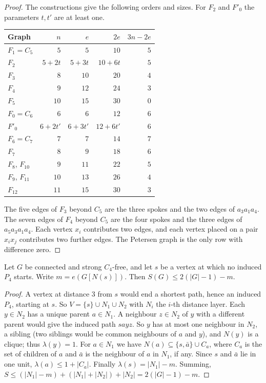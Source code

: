 \documentclass[ASNA]{USG}
\theoremstyle{WBstyletwo}
\numberwithin{equation}{section}
\begin{document}
\begin{proof}
The constructions give the following orders and sizes. For $F_2$ and $F'_0$ the parameters $t,t'$ are at least one.
\begin{center}
\begin{tabular}{@{}lrrrr@{}}
\toprule
Graph & $n$ & $e$ & $2e$ & $3n-2e$\\
\midrule
$F_1=C_5$ & $5$ & $5$ & $10$ & $5$\\
$F_2$ & $5+2t$ & $5+3t$ & $10+6t$ & $5$\\
$F_3$ & $8$ & $10$ & $20$ & $4$\\
$F_4$ & $9$ & $12$ & $24$ & $3$\\
$F_5$ & $10$ & $15$ & $30$ & $0$\\
$F_0=C_6$ & $6$ & $6$ & $12$ & $6$\\
$F'_0$ & $6+2t'$ & $6+3t'$ & $12+6t'$ & $6$\\
$F_6=C_7$ & $7$ & $7$ & $14$ & $7$\\
$F_7$ & $8$ & $9$ & $18$ & $6$\\
$F_8$, $F_{10}$ & $9$ & $11$ & $22$ & $5$\\
$F_9$, $F_{11}$ & $10$ & $13$ & $26$ & $4$\\
$F_{12}$ & $11$ & $15$ & $30$ & $3$\\
\bottomrule
\end{tabular}
\end{center}
The five edges of $F_3$ beyond $C_5$ are the three spokes and the two edges of $a_3a_1a_4$. The seven edges of $F_4$ beyond $C_5$ are the four spokes and the three edges of $a_5a_3a_1a_4$. Each vertex $x_i$ contributes two edges, and each vertex placed on a pair $x_ix_j$ contributes two further edges. The Petersen graph is the only row with difference zero.
\end{proof}

\begin{lemma}\label{lem:rootedp4}
Let $G$ be connected and strong $C_4$-free, and let $s$ be a vertex at which no induced $P_4$ starts. Write $m=e(G[N(s)])$. Then $S(G)\le 2(|G|-1)-m$.
\end{lemma}

\begin{proof}
A vertex at distance $3$ from $s$ would end a shortest path, hence an induced $P_4$, starting at $s$. So $V=\{s\}\cup N_1\cup N_2$ with $N_i$ the $i$-th distance layer. Each $y\in N_2$ has a unique parent $a\in N_1$. A neighbour $z\in N_2$ of $y$ with a different parent would give the induced path $sayz$. So $y$ has at most one neighbour in $N_2$, a sibling (two siblings would be common neighbours of $a$ and $y$), and $N(y)$ is a clique; thus $\lambda(y)=1$. For $a\in N_1$ we have $N(a)\subseteq\{s,\bar a\}\cup C_a$, where $C_a$ is the set of children of $a$ and $\bar a$ is the neighbour of $a$ in $N_1$, if any. Since $s$ and $\bar a$ lie in one unit, $\lambda(a)\le 1+|C_a|$. Finally $\lambda(s)=|N_1|-m$. Summing, $S\le(|N_1|-m)+(|N_1|+|N_2|)+|N_2|=2(|G|-1)-m$.
\end{proof}
\end{document}
